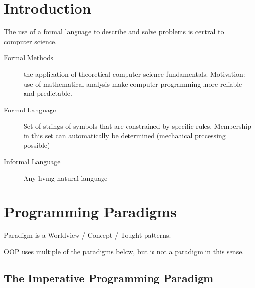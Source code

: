


\newcommand\equalhat{\widehat{=}}
\newcommand\mathSpaceSeparator{\text{ }\text{ }\text{ }\text{ }}


\newcommand{\SUBJECT}{Zusammenfassung}
\newcommand{\TITLE}{Programmieren und Formale Methoden}




\section{Introduction}
The use of a formal language to describe and solve problems is central to computer science.

\begin{description}
	\item[Formal Methods] the application of theoretical computer science fundamentals. Motivation: use of mathematical analysis make computer programming more reliable and predictable.
	\item[Formal Language] Set of strings of symbols that are constrained by specific rules. Membership in this set can automatically be determined (mechanical processing possible)
	\item[Informal Language] Any living natural language
\end{description}

\section{Programming Paradigms}

Paradigm is a Worldview / Concept / Tought patterns.

OOP uses multiple of the paradigms below, but is not a paradigm in this sense.

\subsection{The Imperative Programming Paradigm}

